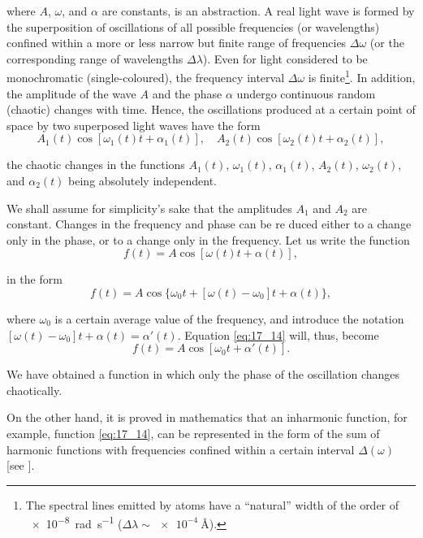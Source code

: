 \noindent
where $A$, $\omega$, and $\alpha$ are constants, is an abstraction.
A real light wave is formed by the superposition of oscillations of all possible frequencies (or wavelengths) confined within a more or less narrow but finite range of frequencies $\Delta{\omega}$ (or the corresponding range of wavelengths $\Delta{\lambda}$).
Even for light considered to be monochromatic (single-coloured), the frequency interval $\Delta{\omega}$ is finite\footnote{The spectral lines emitted by atoms have a ``natural'' width of the order of \SI{e-8}{\radian\per\second} ($\Delta{\lambda}\sim\SI{e-4}{\angstrom}$).}.
In addition, the amplitude of the wave $A$ and the phase $\alpha$ undergo continuous random (chaotic) changes with time.
Hence, the oscillations produced at a certain point of space by two superposed light waves have the form
\begin{equation}\label{eq:17_13}
    A_1(t) \cos[\omega_1(t) t + \alpha_1(t)],\quad A_2(t) \cos[\omega_2(t) t + \alpha_2(t)],
\end{equation}

\noindent
the chaotic changes in the functions $A_1(t)$, $\omega_1(t)$, $\alpha_1(t)$, $A_2(t)$, $\omega_2(t)$, and $\alpha_2(t)$ being absolutely independent.

We shall assume for simplicity's sake that the amplitudes $A_1$ and $A_2$ are constant.
Changes in the frequency and phase can be re duced either to a change only in the phase, or to a change only in the frequency.
Let us write the function
\begin{equation}\label{eq:17_14}
    f(t) = A \cos[\omega(t) t + \alpha(t)],
\end{equation}

\noindent
in the form
\begin{equation*}
    f(t) = A \cos\{\omega_0 t + [\omega(t) - \omega_0] t + \alpha(t)\},
\end{equation*}

\noindent
where $\omega_0$ is a certain average value of the frequency, and introduce the notation $[\omega(t) - \omega_0] t + \alpha(t) = \alpha'(t)$.
Equation \eqref{eq:17_14} will, thus, become
\begin{equation}\label{eq:17_15}
    f(t) = A \cos[\omega_0 t + \alpha'(t)].
\end{equation}

\noindent
We have obtained a function in which only the phase of the oscillation changes chaotically.

On the other hand, it is proved in mathematics that an inharmonic function, for example, function \eqref{eq:17_14}, can be represented in the form of the sum of harmonic functions with frequencies confined within a certain interval $\Delta(\omega)$ [see ].

